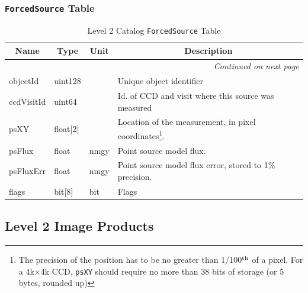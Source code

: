 \documentclass[12pt]{article}
\newcommand{\code}[1]{\texttt{#1}}
\newcommand{\ForcedSource}{\code{ForcedSource}\xspace}
\begin{document}
\subsubsection{\ForcedSource Table}
\label{sec:forcedSourceTable}


\begin{center}
\begin{longtable}{p{3cm}p{2cm}p{2cm}p{5cm}}
\caption[\ForcedSource Table]{Level 2 Catalog \ForcedSource Table
} \\

\hline \multicolumn{1}{c}{\bf Name} & \multicolumn{1}{c}{\bf Type} & \multicolumn{1}{c}{\bf Unit} & \multicolumn{1}{c}{\bf Description} \\ \hline
\endhead

\hline \multicolumn{4}{r}{{\em Continued on next page}} \\
\endfoot

\hline\hline
\endlastfoot

objectId & uint128 & ~ & Unique object identifier \\ 

ccdVisitId & uint64 & ~ & Id. of CCD and visit where this source was measured \\ 

psXY & float[2] & ~ & Location of the measurement, in pixel coordinates\footnote{The precision of the position has to be no greater than 1/100$^{\rm th}$ of a pixel. For a 4k$\times$4k CCD, {\tt psXY} should require no more than 38 bits of storage (or 5 bytes, rounded up)}. \\

psFlux & float & nmgy & Point source model flux.\\ 

psFluxErr & float & nmgy & Point source model flux error,  stored to 1\% precision.\\



flags & bit[8] & bit & Flags \\ \hline
\end{longtable}
\end{center}




\subsection{Level 2 Image Products}
\end{document}
